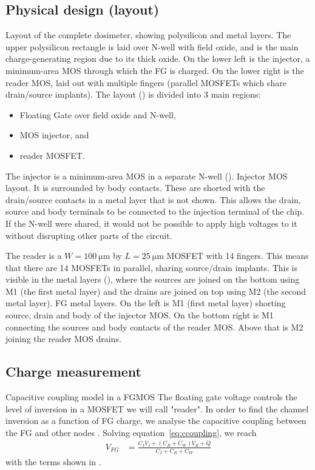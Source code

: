\subsection{Physical design (layout)}
%
{Layout of the complete dosimeter, showing polysilicon and metal layers.
The upper polysilicon rectangle is laid over N-well with field oxide,
and is the main charge-generating region due to its thick oxide.
On the lower left is the injector,
a minimum-area MOS through which the FG is charged.
On the lower right is the reader MOS, laid out with multiple fingers
(parallel MOSFETs which share drain/source implants).}
The layout () is divided into 3 main regions:
\begin{itemize}
    \item Floating Gate over field oxide and N-well,
    \item MOS injector, and
    \item reader MOSFET.
\end{itemize}
The injector is a minimum-area MOS in a separate N-well
().
{Injector MOS layout. It is surrounded by body contacts.
These are shorted with the drain/source contacts
in a metal layer that is not shown.  }
This allows the drain, source and body terminals to be connected to the injection terminal of the chip. If the N-well were shared, it would not be possible to apply high voltages to it without disrupting other parts of the circuit.

The reader is a $W=\SI{100}{\micro\meter}$ 
by $L=\SI{25}{\micro\meter}$ MOSFET with 14 fingers.
This means that there are 14 MOSFETs in parallel,
sharing source/drain implants. 
This is visible in the metal layers (),
where the sources are joined on the bottom using M1 (the first metal layer)
and the drains are joined on top using M2 (the second metal layer).
{FG metal layers.
On the left is M1 (first metal layer)
shorting source, drain and body of the injector MOS.
On the bottom right is M1 connecting the sources and body contacts of the reader MOS.
Above that is M2 joining the reader MOS drains.}
\subsection{Charge measurement}
{Capacitive coupling model in a FGMOS}
The floating gate voltage controls the level of inversion
in a MOSFET we will call "reader".
In order to find the channel inversion as a function of FG charge,
we analyse the capacitive coupling between the FG and other nodes
.
Solving equation~\ref{eq:ccoupling}, we reach
\begin{align*}
    V_{FG} &= \frac{C_I V_I + (C_R+C_W) V_R + Q}{C_I+C_R+C_W}
\end{align*}
with the terms shown in .

